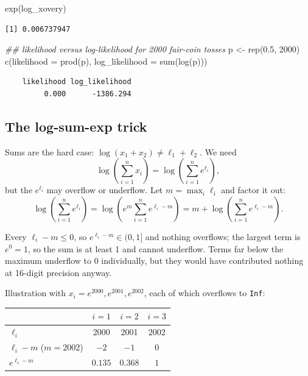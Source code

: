 \documentclass[
  letterpaper,
  DIV=11,
  numbers=noendperiod]{scrreprt}
\newenvironment{Shaded}{\begin{snugshade}}{\end{snugshade}}
\newcommand{\AttributeTok}[1]{\textcolor[rgb]{0.40,0.45,0.13}{#1}}
\newcommand{\DecValTok}[1]{\textcolor[rgb]{0.68,0.00,0.00}{#1}}
\newcommand{\DocumentationTok}[1]{\textcolor[rgb]{0.37,0.37,0.37}{\textit{#1}}}
\newcommand{\FloatTok}[1]{\textcolor[rgb]{0.68,0.00,0.00}{#1}}
\newcommand{\FunctionTok}[1]{\textcolor[rgb]{0.28,0.35,0.67}{#1}}
\newcommand{\NormalTok}[1]{\textcolor[rgb]{0.00,0.23,0.31}{#1}}
\newcommand{\OtherTok}[1]{\textcolor[rgb]{0.00,0.23,0.31}{#1}}
\newcounter{none} %
\begin{document}
\begin{Shaded}
\begin{Highlighting}[]
\FunctionTok{exp}\NormalTok{(log\_xovery)}
\end{Highlighting}
\end{Shaded}

\begin{verbatim}
[1] 0.006737947
\end{verbatim}

\begin{Shaded}
\begin{Highlighting}[]
\DocumentationTok{\#\# likelihood versus log{-}likelihood for 2000 fair{-}coin tosses}
\NormalTok{p }\OtherTok{\textless{}{-}} \FunctionTok{rep}\NormalTok{(}\FloatTok{0.5}\NormalTok{, }\DecValTok{2000}\NormalTok{)}
\FunctionTok{c}\NormalTok{(}\AttributeTok{likelihood =} \FunctionTok{prod}\NormalTok{(p), }\AttributeTok{log\_likelihood =} \FunctionTok{sum}\NormalTok{(}\FunctionTok{log}\NormalTok{(p)))}
\end{Highlighting}
\end{Shaded}

\begin{verbatim}
    likelihood log_likelihood 
         0.000      -1386.294 
\end{verbatim}

\subsection{The log-sum-exp trick}\label{the-log-sum-exp-trick}

Sums are the hard case: \(\log(x_1 + x_2) \neq \ell_1 + \ell_2\). We
need \[
\log\left(\sum_{i=1}^{n} x_i\right) = \log\left(\sum_{i=1}^{n} e^{\ell_i}\right),
\] but the \(e^{\ell_i}\) may overflow or underflow. Let
\(m = \max_i \ell_i\) and factor it out: \[
\log\left(\sum_{i=1}^{n} e^{\ell_i}\right)
= \log\left(e^{m}\sum_{i=1}^{n} e^{\ell_i - m}\right)
= m + \log\left(\sum_{i=1}^{n} e^{\ell_i - m}\right).
\]

Every \(\ell_i - m \le 0\), so \(e^{\ell_i - m} \in (0, 1]\) and nothing
overflows; the largest term is \(e^{0} = 1\), so the sum is at least 1
and cannot underflow. Terms far below the maximum underflow to \(0\)
individually, but they would have contributed nothing at 16-digit
precision anyway.

Illustration with \(x_i = e^{2000}, e^{2001}, e^{2002}\), each of which
overflows to \texttt{Inf}:

{\def\LTcaptype{none} %
\begin{longtable}[]{@{}lccc@{}}
\toprule\noalign{}
& \(i=1\) & \(i=2\) & \(i=3\) \\
\midrule\noalign{}
\endhead
\bottomrule\noalign{}
\endlastfoot
\(\ell_i\) & 2000 & 2001 & 2002 \\
\(\ell_i - m\) (\(m = 2002\)) & \(-2\) & \(-1\) & \(0\) \\
\(e^{\ell_i - m}\) & \(0.135\) & \(0.368\) & \(1\) \\
\end{longtable}
}
\end{document}
